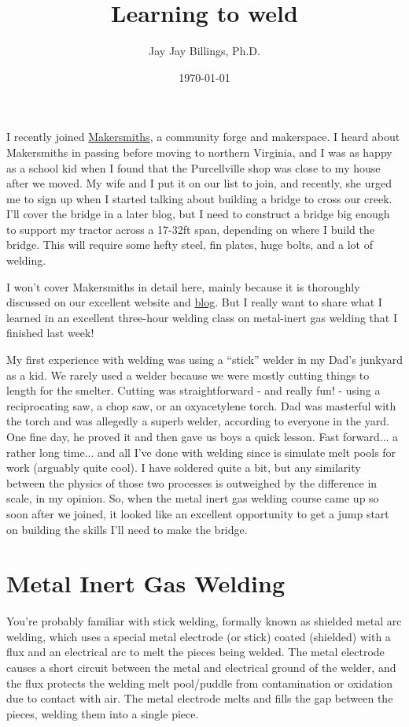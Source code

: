 \documentclass{article}
\title{Learning to weld}
\author{Jay Jay Billings, Ph.D.}
\date{\today}
\begin{document}
\maketitle

I recently joined \href{https://makersmiths.org/}{Makersmiths}, a community forge and makerspace. I heard about Makersmiths in passing before moving to northern Virginia, and I was as happy as a school kid when I found that the Purcellville shop was close to my house after we moved. My wife and I put it on our list to join, and recently, she urged me to sign up when I started talking about building a bridge to cross our creek. I'll cover the bridge in a later blog, but I need to construct a bridge big enough to support my tractor across a 17-32ft span, depending on where I build the bridge. This will require some hefty steel, fin plates, huge bolts, and a lot of welding.

I won't cover Makersmiths in detail here, mainly because it is thoroughly discussed on our excellent website and \href{https://makersmiths.org/Blog}{blog}. But I really want to share what I learned in an excellent three-hour welding class on metal-inert gas welding that I finished last week! 

My first experience with welding was using a ``stick'' welder in my Dad's junkyard as a kid. We rarely used a welder because we were mostly cutting things to length for the smelter. Cutting was straightforward - and really fun! - using a reciprocating saw, a chop saw, or an oxyacetylene torch. Dad was masterful with the torch and was allegedly a superb welder, according to everyone in the yard. One fine day, he proved it and then gave us boys a quick lesson. Fast forward... a rather long time... and all I've done with welding since is simulate melt pools for work (arguably quite cool). I have soldered quite a bit, but any similarity between the physics of those two processes is outweighed by the difference in scale, in my opinion. So, when the metal inert gas welding course came up so soon after we joined, it looked like an excellent opportunity to get a jump start on building the skills I'll need to make the bridge.

\section*{Metal Inert Gas Welding}

You're probably familiar with stick welding, formally known as shielded metal arc welding, which uses a special metal electrode (or stick) coated (shielded) with a flux and an electrical arc to melt the pieces being welded. The metal electrode causes a short circuit between the metal and electrical ground of the welder, and the flux protects the welding melt pool/puddle from contamination or oxidation due to contact with air. The metal electrode melts and fills the gap between the pieces, welding them into a single piece.
\end{document}
